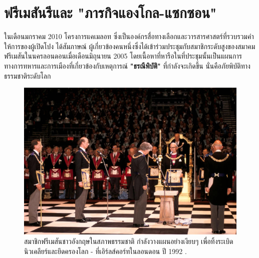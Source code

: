 \documentclass[10pt,twocolumn,letterpaper]{article}
\begin{document}
\section{ฟรีเมสันรีและ "ภารกิจแองโกล-แซกซอน"}
ในเดือนมกราคม 2010 โครงการแคเมลอท ซึ่งเป็นองค์กรสื่อทางเลือกและวารสารศาสตร์ที่รวบรวมคำให้การของผู้เปิดโปง ได้สัมภาษณ์ \cite{4,6} ผู้เกี่ยวข้องคนหนึ่งซึ่งได้เข้าร่วมประชุมกับสมาชิกระดับสูงของสมาคมฟรีเมสันในนครลอนดอนเมื่อเดือนมิถุนายน 2005 โดยเนื้อหาที่หารือในที่ประชุมนั้นเป็นแผนการทางการทหารและการเมืองที่เกี่ยวข้องกับเหตุการณ์ \textbf{"ธรณีพิบัติ"} ที่กำลังจะเกิดขึ้น นั่นคือภัยพิบัติทางธรรมชาติระดับโลก

\begin{figure}[b]
\begin{center}
   \includegraphics[width=1\linewidth]{freemason.jpg}
\end{center}
   \caption{สมาชิกฟรีเมสันชาวอังกฤษในสภาพธรรมชาติ กำลังวางแผนอย่างเงียบๆ เพื่อทิ้งระเบิดนิวเคลียร์และยึดครองโลก - ที่เอิร์ลส์คอร์ทในลอนดอน ปี 1992 \cite{5}.}
\label{fig:1}
\label{fig:onecol}
\end{figure}
\end{document}
